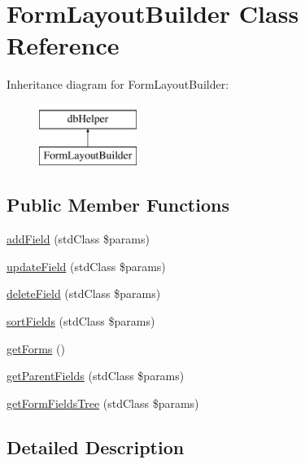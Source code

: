 \hypertarget{class_form_layout_builder}{\section{\-Form\-Layout\-Builder \-Class \-Reference}
\label{class_form_layout_builder}
}
\-Inheritance diagram for \-Form\-Layout\-Builder\-:\begin{figure}[H]
\begin{center}
\leavevmode
\includegraphics[height=2.000000cm]{class_form_layout_builder}
\end{center}
\end{figure}
\subsection*{\-Public \-Member \-Functions}
\begin{DoxyCompactItemize}
\item 
\hyperlink{class_form_layout_builder_a9b4218d44df735712697afcd63ee542a}{add\-Field} (std\-Class \$params)
\item 
\hyperlink{class_form_layout_builder_a605ceacafef9bf191f738e434d731ce2}{update\-Field} (std\-Class \$params)
\item 
\hyperlink{class_form_layout_builder_a43268d844218fd4ca8254bac75031479}{delete\-Field} (std\-Class \$params)
\item 
\hyperlink{class_form_layout_builder_a53a3f3a0264126d592421492cfb4a11d}{sort\-Fields} (std\-Class \$params)
\item 
\hyperlink{class_form_layout_builder_a9ff1809bc98bb7a1526eb4e035c1ffa8}{get\-Forms} ()
\item 
\hyperlink{class_form_layout_builder_ad7d4c76349c0ed04f32ca58530ffd16b}{get\-Parent\-Fields} (std\-Class \$params)
\item 
\hyperlink{class_form_layout_builder_ac89522e4c6cb3d293adce3bd72e91827}{get\-Form\-Fields\-Tree} (std\-Class \$params)
\end{DoxyCompactItemize}


\subsection{\-Detailed \-Description}


